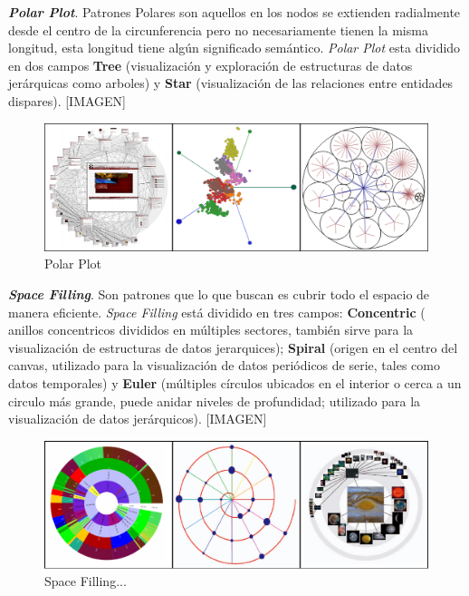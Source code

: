 \textbf{\textit{Polar Plot}}.  Patrones Polares son aquellos en los nodos se extienden radialmente desde el centro de la circunferencia pero no necesariamente tienen la misma longitud, esta longitud tiene algún significado semántico. \textit{Polar Plot} esta dividido en dos campos \textbf{Tree} (visualización y exploración de estructuras de datos jerárquicas como arboles) y \textbf{Star} (visualización de las relaciones entre entidades dispares).
\textcolor[rgb]{0.2,0.8,0.2}{[IMAGEN]}
\begin{figure}[!h]
\centering
\includegraphics[width=0.8\columnwidth]{figs/PolarPlot}%
\caption{Polar Plot}%
\label{fig:PolarPlot}%
\end{figure}

\textbf{\textit{Space Filling}}. Son patrones que lo que buscan es cubrir todo el espacio de manera eficiente.  \textit{Space Filling} está dividido en tres campos: \textbf{Concentric} ( anillos concentricos divididos en múltiples sectores, también sirve para la visualización de estructuras de datos jerarquices); \textbf{Spiral} (origen en el centro del canvas, utilizado para la visualización de datos periódicos de serie, tales como datos temporales) y \textbf{Euler} (múltiples círculos ubicados en el interior o cerca a un circulo más grande, puede anidar niveles de profundidad; utilizado para la visualización de datos jerárquicos).
\textcolor[rgb]{0.2,0.8,0.2}{[IMAGEN]}
\begin{figure}[!h]
\centering
\includegraphics[width=0.8\columnwidth]{figs/SpaceFilling}%
\caption{Space Filling...}%
\label{fig:SpaceFilling}%
\end{figure}


